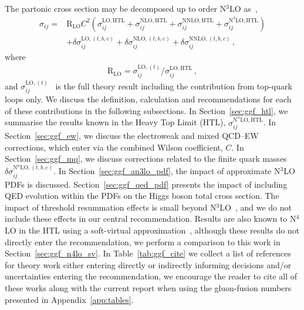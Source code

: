 The partonic cross section may be decomposed up to order N$^3$LO as~\cite{Dulat:2018rbf},
\begin{align}
\sigma_{ij} = & 
\mathrm{R}_\mathrm{LO} C^2 \left( 
\sigma_{ij}^{\mathrm{LO}, \mathrm{HTL}} 
+ \sigma_{ij}^{\mathrm{NLO}, \mathrm{HTL}} 
+ \sigma_{ij}^{\mathrm{NNLO}, \mathrm{HTL}} 
+\sigma_{ij}^{\mathrm{N}^3\mathrm{LO}, \mathrm{HTL}} \right) \nonumber \\ 
&+ \delta \sigma_{ij}^{\mathrm{LO}, (t,b,c)}
+ \delta \sigma_{ij}^{\mathrm{NLO}, (t,b,c)}
+ \delta \sigma_{ij}^{\mathrm{NNLO}, (t,b,c)}\,, 
\label{eq:ggf_master}
\end{align}
where \begin{align}
  \label{eq:RLO}
  \mathrm{R}_\mathrm{LO} = \sigma_{ij}^{\mathrm{LO},(t)}/\sigma_{ij}^{\mathrm{LO}, \mathrm{HTL}}\,,\end{align}
and $\sigma_{ij}^{\mathrm{LO},(t)}$~\cite{Georgi:1977gs,Wilczek:1977zn} is the full theory result including the contribution from top-quark loops only. We discuss the definition, calculation and recommendations for each of these contributions in the following subsections.
In Section~\ref{sec:ggf_htl}, we summarise the results known in  the Heavy Top Limit (HTL), $\sigma_{ij}^{\mathrm{N}^n\mathrm{LO},\mathrm{HTL}}$.
In Section~\ref{sec:ggf_ew}, we discuss the electroweak and mixed QCD--EW corrections, which enter via the combined Wilson coefficient, $C$.
In Section~\ref{sec:ggf_mq}, we discuss corrections related to the finite quark masses $\delta \sigma_{ij}^{\mathrm{N}^n\mathrm{LO},(t,b,c)}$.
In Section~\ref{sec:ggf_an3lo_pdf}, the impact of approximate N$^3$LO PDFs is discussed.
Section~\ref{sec:ggf_qed_pdf} presents the impact of including QED evolution within the PDFs on the Higgs boson total cross section.
The impact of threshold resummation effects is small beyond N$^3$LO~\cite{Anastasiou:2016cez,Bonvini:2014joa,Catani:2014uta}, and we do not include these effects in our central recommendation.
Results are also known to N$^4$LO in the HTL using a soft-virtual approximation~\cite{Das:2020adl}, although these results do not directly enter the recommendation, we perform a comparison to this work in Section~\ref{sec:ggf_n4lo_sv}.
In Table~\ref{tab:ggf_cite} we collect a list of references for theory work either entering directly or indirectly informing decisions and/or uncertainties entering the recommendation, we encourage the reader to cite all of these works along with the current report when using the gluon-fusion numbers presented in Appendix~\ref{app:tables}.

